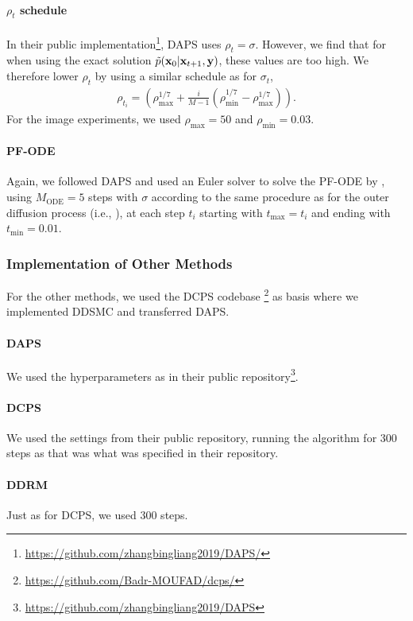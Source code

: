 \paragraph{$\rho_t$ schedule}
In their public implementation\footnote{\url{https://github.com/zhangbingliang2019/DAPS/}}, DAPS uses $\rho_t=\sigma$. However, we find that for when using the exact solution $\tilde p(\mathbf{x}_0|\mathbf{x}_{t+1}, \mathbf{y})$, these values are too high. We therefore lower $\rho_t$ by using a similar schedule as for $\sigma_t$, 
\begin{align}
    \rho_{t_i} = \left( \rho_\text{max}^{1/7} + \frac{i}{M-1}\left(\rho_\text{min}^{1/7} - \rho_\text{max}^{1/7}\right)\right).
\end{align}
For the image experiments, we used $\rho_\text{max} = 50$ and $\rho_\text{min}=0.03$. 

\paragraph{PF-ODE}
Again, we followed DAPS and used an Euler solver to solve the PF-ODE by \citet{karras_elucidating_2022-1}, using $M_\text{ODE}=5$ steps with $\sigma$ according to the same procedure as for the outer diffusion process (i.e., ), at each step $t_i$ starting with $t_\text{max} = t_i$ and ending with $t_\text{min} = 0.01$.

\subsubsection{Implementation of Other Methods}
For the other methods, we used the DCPS codebase \footnote{\url{https://github.com/Badr-MOUFAD/dcps/}} as basis where we implemented DDSMC and transferred DAPS.

\paragraph{DAPS}
We used the hyperparameters as in their public repository\footnote{\url{https://github.com/zhangbingliang2019/DAPS}}.

\paragraph{DCPS}
We used the settings from their public repository, running the algorithm for 300 steps as that was what was specified in their repository.

\paragraph{DDRM}
Just as for DCPS, we used 300 steps.

